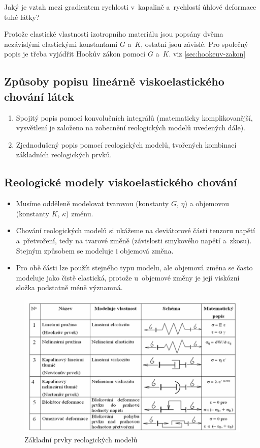 Jaký je vztah mezi gradientem rychlosti v~kapalině a~rychlostí úhlové deformace tuhé látky?

Protože elastické vlastnosti izotropního materiálu jsou popsány dvěma nezávislými elastickými konstantami $G$ a~$K$, ostatní jsou závislé.
Pro společný popis je třeba vyjádřit Hookův zákon pomocí $G$ a~$K$. viz \ref{sec:hookeuv-zakon}

\subsection{Způsoby popisu lineárně viskoelastického chování látek}
\begin{enumerate}
	\item Spojitý popis pomocí konvolučních integrálů (matematicky komplikovanější, vysvětlení je založeno na zobecnění reologických modelů uvedených dále).
	\item Zjednodušený popis pomocí reologických modelů, tvořených kombinací základních reologických prvků.
\end{enumerate}

\subsection{Reologické modely viskoelastického chování}
\begin{itemize}
	\item Musíme odděleně modelovat tvarovou (konstanty $G$, $\eta$) a objemovou (konstanty $K$, $\kappa$) změnu.
	\item Chování reologických modelů si ukážeme na deviátorové části tenzoru napětí a~přetvoření, tedy na tvarové změně (závislosti smykového napětí a~zkosu). Stejným způsobem se modeluje i objemová změna.
	\item Pro obě části lze použít stejného typu modelu, ale objemová změna se často modeluje jako čistě elastická, protože u~objemové změny je její viskózní složka podstatně méně významná.
\end{itemize}

\begin{figure}[H]
	\centering
	\includegraphics[width=0.8\linewidth]{Obrazky/prvky-reologickych-modelu}
	\caption{Základní prvky reologických modelů }
	\label{fig:prvky-reologickych-modelu}
\end{figure}

